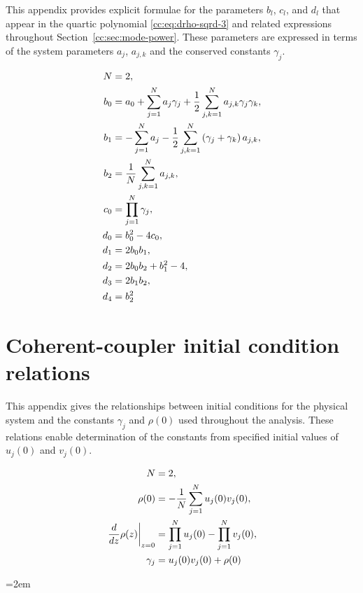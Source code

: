 \documentclass[11pt,a4paper]{article}
\begin{document}
This appendix provides explicit formulae for the parameters $b_l$, $c_l$, and $d_l$ that appear in the quartic polynomial \eqref{cc:eq:drho-sqrd-3} and related expressions throughout Section~\ref{cc:sec:mode-power}.
These parameters are expressed in terms of the system parameters $a_j$, $a_{j,k}$ and the conserved constants $\gamma_j$.

\begin{align}
N &= 2,\\
{b}_{0} &= {a}_{0} + \sum_{j=1}^{N} {a}_{j} {\gamma}_{j} + \frac{1}{2}\sum\limits_{j,k=1}^{N} {a}_{j,k} {\gamma}_{j} {\gamma}_{k}, \notag \\
{b}_{1} &= - \sum_{j=1}^{N} {a}_{j} - \frac{1}{2}\sum\limits_{j,k=1}^{N} \left({\gamma}_{j} + {\gamma}_{k}\right) {a}_{j,k}, \notag \\
{b}_{2} &= \frac{1}{N}\sum\limits_{j,k=1}^{N} {a}_{j,k}, \notag \\
{c}_{0} &= \prod_{j=1}^{N} {\gamma}_{j}, \notag \\
{d}_{0} &= {b}_{0}^{2} - 4 {c}_{0}, \notag \\
{d}_{1} &= 2 {b}_{0} {b}_{1}, \notag \\
{d}_{2} &= 2 {b}_{0} {b}_{2} + {b}_{1}^{2} - 4, \notag \\
{d}_{3} &= 2 {b}_{1} {b}_{2}, \notag \\
{d}_{4} &= {b}_{2}^{2}
\end{align}


\section{Coherent-coupler initial condition relations}
\label{cc:app:init-conds}

This appendix gives the relationships between initial conditions for the physical system and the constants $\gamma_j$ and $\rho(0)$ used throughout the analysis.
These relations enable determination of the constants from specified initial values of $u_j(0)$ and $v_j(0)$.

\begin{align}
N &= 2, \notag \\
\rho{\left(0 \right)} &= - \frac{1}{N}\sum_{j=1}^{N} u_j{\left(0 \right)} v_j{\left(0 \right)}, \notag \\
\left. \frac{d}{d z} \rho{\left(z \right)} \right|_{\substack{ z=0 }} &= \prod_{j=1}^{N} u_j(0) - \prod_{j=1}^{N} v_j(0), \notag \\
{\gamma}_{j} &= u_j{\left(0\right)} v_j{\left(0 \right)} + \rho{\left(0 \right)}
\end{align}



\FloatBarrier
\begingroup
\emergencystretch=2em
\printbibliography
\endgroup
\end{document}
